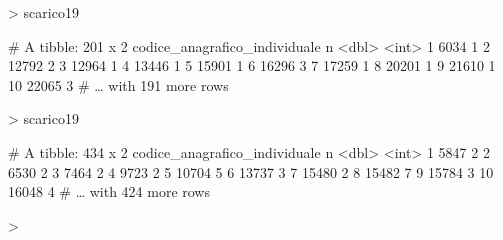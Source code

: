 \documentclass{article}
\begin{document}
\begin{Schunk}
\begin{Sinput}
> scarico19 %
\end{Sinput}
\begin{Soutput}
# A tibble: 201 x 2
   codice_anagrafico_individuale     n
                           <dbl> <int>
 1                          6034     1
 2                         12792     2
 3                         12964     1
 4                         13446     1
 5                         15901     1
 6                         16296     3
 7                         17259     1
 8                         20201     1
 9                         21610     1
10                         22065     3
# … with 191 more rows
\end{Soutput}
\begin{Sinput}
> scarico19 %
\end{Sinput}
\begin{Soutput}
# A tibble: 434 x 2
   codice_anagrafico_individuale     n
                           <dbl> <int>
 1                          5847     2
 2                          6530     2
 3                          7464     2
 4                          9723     2
 5                         10704     5
 6                         13737     3
 7                         15480     2
 8                         15482     7
 9                         15784     3
10                         16048     4
# … with 424 more rows
\end{Soutput}
\begin{Sinput}
> 
\end{Sinput}
\end{Schunk}
\end{document}
